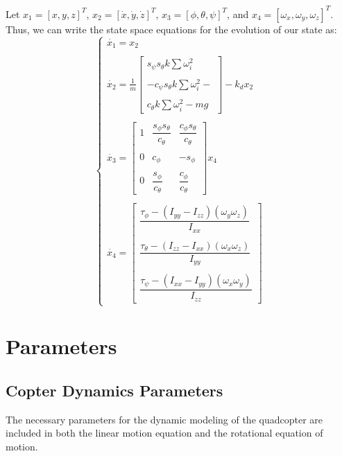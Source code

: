 \documentclass{article}
\begin{document}
Let $x_1=[x,y,z]^T$, $x_2=[\dot{x},\dot{y},\dot{z}]^T$, $x_3=[\phi,\theta,\psi]^T$, and $x_4=[\omega_x,\omega_y,\omega_z]^T$. Thus, we can write the state space equations for the evolution of our state as:
\begin{equation}
\left\{
\begin{array}{rl}
\dot{x_1} = x_2 \\\\
\dot{x_2} =  \frac{1}{m} \begin{bmatrix} s_{\psi}s_{\theta} k\sum\nolimits \omega_i^2 \\\\
							-c_{\psi}s_{\theta} k\sum\nolimits \omega_i^2 -  \\\\
							c_{\theta} k\sum\nolimits \omega_i^2 -mg 
			\end{bmatrix} - k_dx_2 \\\\
\dot{x_3} = \begin{bmatrix} 1 & \dfrac{s_{\phi}s_{\theta}}{c_{\theta}} & \dfrac{c_{\phi}s_{\theta}}{c_{\theta}} \\\\
0 & c_{\phi} & -s_{\phi}	\\\\
0 & \dfrac{s_{\phi}}{c_{\theta}} & \dfrac{c_{\phi}}{c_{\theta}}
\end{bmatrix} x_4 \\\\
\dot{x_4} =  \begin{bmatrix}
				\dfrac{\tau_{\phi}-(I_{yy}-I_{zz})(\omega_y\omega_z)}{I_{xx}}\\\\
				\dfrac{\tau_{\theta}-(I_{zz}-I_{xx})(\omega_x\omega_z)}{I_{yy}}\\\\
				\dfrac{\tau_{\psi}-(I_{xx}-I_{yy})(\omega_x\omega_y)}{I_{zz}}
				\end{bmatrix}
\end{array}
\right.
\end{equation}
\section{Parameters}
\subsection{Copter Dynamics Parameters}
The necessary parameters for the dynamic modeling of the quadcopter are included in both the linear motion equation and the rotational equation of motion.\\
\end{document}

